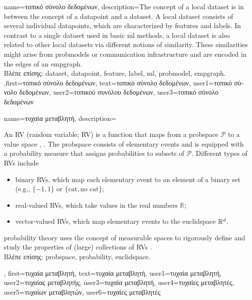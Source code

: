 {name={\foreignlanguage{greek}{τοπικό σύνολο δεδομένων}},
	description={The concept of a local \gls{dataset} is 
		in between the concept of a \gls{datapoint} and a \gls{dataset}. A local \gls{dataset} consists of several 
		individual \gls{datapoint}s, which are characterized by \gls{feature}s and \gls{label}s. 
		In contrast to a single \gls{dataset} used in basic \gls{ml} methods, a local \gls{dataset} is also 
		related to other local \gls{dataset}s via different notions of similarity. These similarities 
		might arise from \gls{probmodel}s or communication infrastructure and 
		are encoded in the edges of an \gls{empgraph}.\\
		\foreignlanguage{greek}{Βλέπε επίσης:} \gls{dataset}, \gls{datapoint}, \gls{feature}, \gls{label}, \gls{ml}, \gls{probmodel}, \gls{empgraph}.
		},first={\foreignlanguage{greek}{τοπικό σύνολο δεδομένων}},
		text={\foreignlanguage{greek}{τοπικό σύνολο δεδομένων}},
		user1={\foreignlanguage{greek}{τοπικό σύνολο δεδομένων}}, %
		user2={\foreignlanguage{greek}{τοπικού συνόλου δεδομένων}}, %
		user3={\foreignlanguage{greek}{τοπικό σύνολο δεδομένων}} %
}

{name={\foreignlanguage{greek}{τυχαία μεταβλητή}},
	description={An RV (random variable; RV) is a function that maps from 
 		a \gls{probspace} $\mathcal{P}$ to a value space \cite{GrayProbBook}, \cite{BillingsleyProbMeasure}. 
 		The \gls{probspace} consists of elementary events and is equipped with a \gls{probability} 
 		measure that assigns probabilities to subsets of $\mathcal{P}$. 
 		Different types of RVs include  
 		\begin{itemize} 
 		\item {binary RVs}, which map each elementary event to an element of a binary set (e.g., $\{-1,1\}$ or $\{\text{cat}, \text{no cat}\}$; 
 		\item {real-valued RVs}, which take values in the real numbers $\mathbb{R}$;  
 		\item {vector-valued RVs}, which map elementary events to the \gls{euclidspace} $\mathbb{R}^{d}$.  
 		\end{itemize} 
 		\Gls{probability} theory uses the concept of measurable spaces to rigorously define 
 		and study the properties of (large) collections of RVs \cite{BillingsleyProbMeasure}.\\
	\foreignlanguage{greek}{Βλέπε επίσης:} \gls{probspace}, \gls{probability}, \gls{euclidspace}.
	}, first={\foreignlanguage{greek}{τυχαία μεταβλητή}},
	text={\foreignlanguage{greek}{τυχαία μεταβλητή}},
	user1={\foreignlanguage{greek}{τυχαία μεταβλητή}}, %
	user2={\foreignlanguage{greek}{τυχαίας μεταβλητής}}, %
	user3={\foreignlanguage{greek}{τυχαία μεταβλητή}}, %
	user4={\foreignlanguage{greek}{τυχαίες μεταβλητές}}, %
	user5={\foreignlanguage{greek}{τυχαίων μεταβλητών}}, %
	user6={\foreignlanguage{greek}{τυχαίες μεταβλητές}} %
}

